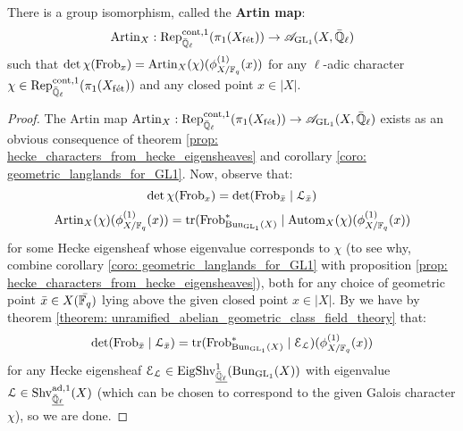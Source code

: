             \begin{theorem} \label{theorem: artin_reciprocity_for_function_fields_over_finite_fields}
                \cite[Theorem VI.5.5]{neukirch_2010_algebraic_number_theory} There is a group isomorphism, called the \textbf{Artin map}:
                    $$\mathrm{Artin}_X: \mathrm{Rep}^{\mathrm{cont}, 1}_{\bar{\mathbb{Q}}_{\ell}}(\pi_1(X_{\mathrm{f\acute{e}t}})) \to \mathscr{A}_{\operatorname{GL}_1}(X, \bar{\mathbb{Q}}_{\ell})$$
                such that $\det \chi(\mathrm{Frob}_x) = \mathrm{Artin}_X(\chi)(\phi_{X/\mathbb{F}_q}^{(1)}(x))$ for any $\ell$-adic character $\chi \in \mathrm{Rep}^{\mathrm{cont}, 1}_{\bar{\mathbb{Q}}_{\ell}}(\pi_1(X_{\mathrm{f\acute{e}t}}))$ and any closed point $x \in |X|$.
            \end{theorem}
                \begin{proof}
                    The Artin map $\mathrm{Artin}_X: \mathrm{Rep}^{\mathrm{cont}, 1}_{\bar{\mathbb{Q}}_{\ell}}(\pi_1(X_{\mathrm{f\acute{e}t}})) \to \mathscr{A}_{\operatorname{GL}_1}(X, \bar{\mathbb{Q}}_{\ell})$ exists as an obvious consequence of theorem \ref{prop: hecke_characters_from_hecke_eigensheaves} and corollary \ref{coro: geometric_langlands_for_GL1}. Now, observe that:
                        $$\det \chi(\mathrm{Frob}_x) = \det(\mathrm{Frob}_{\bar{x}} \mid \mathcal{L}_{\bar{x}})$$
                        $$\mathrm{Artin}_X(\chi)(\phi_{X/\mathbb{F}_q}^{(1)}(x)) = \operatorname{tr}(\mathrm{Frob}_{\mathrm{Bun}_{\operatorname{GL}_1}(X)}^* \mid \mathrm{Autom}_X(\chi)(\phi_{X/\mathbb{F}_q}^{(1)}(x))$$
                    for some Hecke eigensheaf whose eigenvalue corresponds to $\chi$ (to see why, combine corollary \ref{coro: geometric_langlands_for_GL1} with proposition \ref{prop: hecke_characters_from_hecke_eigensheaves}), both for any choice of geometric point $\bar{x} \in X(\bar{\mathbb{F}_q})$ lying above the given closed point $x \in |X|$. By we have by theorem \ref{theorem: unramified_abelian_geometric_class_field_theory} that:
                        $$\det(\mathrm{Frob}_{\bar{x}} \mid \mathcal{L}_{\bar{x}}) = \operatorname{tr}(\mathrm{Frob}_{\mathrm{Bun}_{\operatorname{GL}_1}(X)}^* \mid \mathcal{E}_{\mathcal{L}})(\phi_{X/\mathbb{F}_q}^{(1)}(x))$$
                    for any Hecke eigensheaf $\mathcal{E}_{\mathcal{L}} \in \mathrm{Eig}\mathrm{Shv}_{\underline{\bar{\mathbb{Q}}_{\ell}}}^1(\mathrm{Bun}_{\operatorname{GL}_1}(X))$ with eigenvalue $\mathcal{L} \in \mathrm{Shv}_{\underline{\bar{\mathbb{Q}}_{\ell}}}^{\mathrm{ad}, 1}(X)$ (which can be chosen to correspond to the given Galois character $\chi$), so we are done.
                \end{proof}
                
